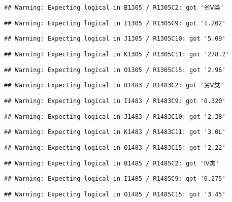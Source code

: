 \documentclass[
]{article}
\begin{document}
\begin{verbatim}
## Warning: Expecting logical in B1305 / R1305C2: got '劣Ⅴ类'
\end{verbatim}

\begin{verbatim}
## Warning: Expecting logical in I1305 / R1305C9: got '1.202'
\end{verbatim}

\begin{verbatim}
## Warning: Expecting logical in J1305 / R1305C10: got '5.09'
\end{verbatim}

\begin{verbatim}
## Warning: Expecting logical in K1305 / R1305C11: got '278.2'
\end{verbatim}

\begin{verbatim}
## Warning: Expecting logical in O1305 / R1305C15: got '2.96'
\end{verbatim}

\begin{verbatim}
## Warning: Expecting logical in B1483 / R1483C2: got '劣Ⅴ类'
\end{verbatim}

\begin{verbatim}
## Warning: Expecting logical in I1483 / R1483C9: got '0.320'
\end{verbatim}

\begin{verbatim}
## Warning: Expecting logical in J1483 / R1483C10: got '2.38'
\end{verbatim}

\begin{verbatim}
## Warning: Expecting logical in K1483 / R1483C11: got '3.0L'
\end{verbatim}

\begin{verbatim}
## Warning: Expecting logical in O1483 / R1483C15: got '2.22'
\end{verbatim}

\begin{verbatim}
## Warning: Expecting logical in B1485 / R1485C2: got 'Ⅳ类'
\end{verbatim}

\begin{verbatim}
## Warning: Expecting logical in I1485 / R1485C9: got '0.275'
\end{verbatim}

\begin{verbatim}
## Warning: Expecting logical in O1485 / R1485C15: got '3.45'
\end{verbatim}
\end{document}
